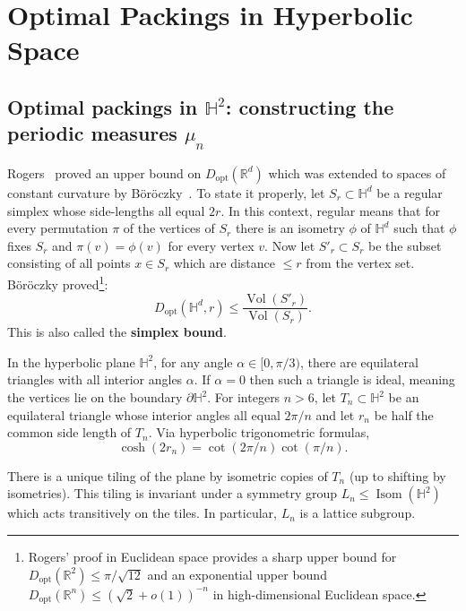 \documentclass[11pt]{amsart}
\theoremstyle{definition}
\theoremstyle{remark}
\renewcommand{\H}{\mathbb{H}}
\newcommand{\R}{\mathbb{R}}
\newcommand{\Isom}{\operatorname{Isom}}
\newcommand{\opt}{\operatorname{opt}}
\newcommand{\Dopt}{D_{\opt}}
\newcommand{\Vol}{\operatorname{Vol}}
\begin{document}
\section{Optimal Packings in Hyperbolic Space} \label{sec:packings}


\subsection{Optimal packings in \texorpdfstring{$\H^2$}{H^2}: constructing the periodic measures \texorpdfstring{$\mu_n$}{mu^n}}
\label{secLatticeMeasures}



Rogers~\cite{rogers1958packing} proved an upper bound on $\Dopt(\R^d)$ which was extended to spaces of constant curvature by B\"or\"oczky~\cite{boroczky1978packing}. To state it properly, let $S_r \subset \H^d$ be a regular simplex whose side-lengths all equal $2r$. In this context, regular means that for every permutation $\pi$ of the vertices of $S_r$ there is an isometry $\phi$ of $\H^d$ such that $\phi$ fixes $S_r$ and $\pi(v)=\phi(v)$ for every vertex $v$. Now let $S'_r \subset S_r$ be the subset consisting of all points $x\in S_r$ which are distance $\le r$ from the vertex set. B\"or\"oczky proved\footnote{Rogers' proof in Euclidean space \cite{rogers1958packing} provides a sharp upper bound for $\Dopt(\R^2) \leq \pi/\sqrt{12}$ and an exponential upper bound $\Dopt(\R^n) \leq (\sqrt{2} + o(1))^{-n}$ in high-dimensional Euclidean space.}: 
$$\Dopt(\H^d,r) \le \frac{\Vol(S'_r)}{\Vol(S_r)}.$$
This is also called the \textbf{simplex bound}. 



In the hyperbolic plane $\H^2$, for any angle $\alpha \in [0,\pi/3)$, there are equilateral triangles with all interior angles $\alpha$. If $\alpha=0$ then such a triangle is ideal, meaning the vertices lie on the boundary $\partial \H^2$. For integers $n>6$, let $T_n \subset \H^2$ be an equilateral triangle whose interior angles all equal $2\pi/n$ and let $r_n$ be half the common side length of $T_n$. Via hyperbolic trigonometric formulas,  
\begin{equation} \label{eq:r_n-def}
\cosh(2r_n) = \cot(2\pi/n)\cot(\pi/n).
\end{equation}

There is a unique tiling of the plane by isometric copies of $T_n$ (up to shifting by isometries). This tiling is invariant under a symmetry group $L_n \le \Isom(\H^2)$ which acts transitively on the tiles. In particular, $L_n$ is a lattice subgroup.
\end{document}
